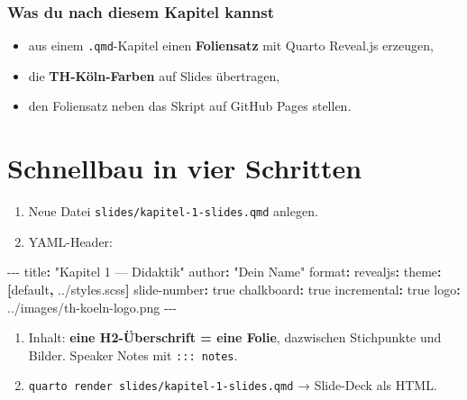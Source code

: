 \documentclass[
  ngerman,
  a4paper,
  DIV=11]{scrreprt}
\newenvironment{Shaded}{\begin{snugshade}}{\end{snugshade}}
\newcommand{\AttributeTok}[1]{\textcolor[rgb]{0.40,0.45,0.13}{#1}}
\newcommand{\CharTok}[1]{\textcolor[rgb]{0.13,0.47,0.30}{#1}}
\newcommand{\FunctionTok}[1]{\textcolor[rgb]{0.28,0.35,0.67}{#1}}
\newcommand{\KeywordTok}[1]{\textcolor[rgb]{0.00,0.23,0.31}{\textbf{#1}}}
\newcommand{\PreprocessorTok}[1]{\textcolor[rgb]{0.68,0.00,0.00}{#1}}
\newcommand{\StringTok}[1]{\textcolor[rgb]{0.13,0.47,0.30}{#1}}
\providecommand{\tightlist}{%
  \setlength{\itemsep}{0pt}\setlength{\parskip}{0pt}}
\begin{document}
\subsubsection{Was du nach diesem Kapitel
kannst}\label{was-du-nach-diesem-kapitel-kannst-6}

\begin{itemize}
\tightlist
\item
  aus einem \texttt{.qmd}-Kapitel einen \textbf{Foliensatz} mit Quarto
  Reveal.js erzeugen,
\item
  die \textbf{TH-Köln-Farben} auf Slides übertragen,
\item
  den Foliensatz neben das Skript auf GitHub Pages stellen.
\end{itemize}

\section{Schnellbau in vier
Schritten}\label{schnellbau-in-vier-schritten}

\begin{enumerate}
\def\labelenumi{\arabic{enumi}.}
\tightlist
\item
  Neue Datei \texttt{slides/kapitel-1-slides.qmd} anlegen.
\item
  YAML-Header:
\end{enumerate}

\begin{Shaded}
\begin{Highlighting}[]
\PreprocessorTok{{-}{-}{-}}
\FunctionTok{title}\KeywordTok{:}\AttributeTok{ }\StringTok{"Kapitel 1 — Didaktik"}
\FunctionTok{author}\KeywordTok{:}\AttributeTok{ }\StringTok{"Dein Name"}
\FunctionTok{format}\KeywordTok{:}
\AttributeTok{  }\FunctionTok{revealjs}\KeywordTok{:}
\AttributeTok{    }\FunctionTok{theme}\KeywordTok{:}\AttributeTok{ }\KeywordTok{[}\AttributeTok{default}\KeywordTok{,}\AttributeTok{ ../styles.scss}\KeywordTok{]}
\AttributeTok{    }\FunctionTok{slide{-}number}\KeywordTok{:}\AttributeTok{ }\CharTok{true}
\AttributeTok{    }\FunctionTok{chalkboard}\KeywordTok{:}\AttributeTok{ }\CharTok{true}
\AttributeTok{    }\FunctionTok{incremental}\KeywordTok{:}\AttributeTok{ }\CharTok{true}
\AttributeTok{    }\FunctionTok{logo}\KeywordTok{:}\AttributeTok{ ../images/th{-}koeln{-}logo.png}
\PreprocessorTok{{-}{-}{-}}
\end{Highlighting}
\end{Shaded}

\begin{enumerate}
\def\labelenumi{\arabic{enumi}.}
\setcounter{enumi}{2}
\tightlist
\item
  Inhalt: \textbf{eine H2-Überschrift = eine Folie}, dazwischen
  Stichpunkte und Bilder. Speaker Notes mit \texttt{:::\ notes}.
\item
  \texttt{quarto\ render\ slides/kapitel-1-slides.qmd} → Slide-Deck als
  HTML.
\end{enumerate}
\end{document}
